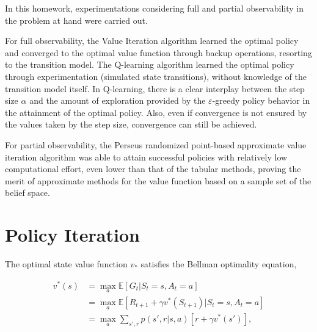 \documentclass[a4paper]{article}
\begin{document}
In this homework, experimentations considering full and partial observability in the problem at hand were carried out.

For full observability, the Value Iteration algorithm learned the optimal policy and converged to the optimal value function through backup operations, resorting to the transition model. The Q-learning algorithm learned the optimal policy through experimentation (simulated state transitions), without knowledge of the transition model itself. In Q-learning, there is a clear interplay between the step size $\alpha$ and the amount of exploration provided by the $\varepsilon$-greedy policy behavior in the attainment of the optimal policy. Also, even if convergence is not ensured by the values taken by the step size, convergence can still be achieved. 

For partial observability, the Perseus randomized point-based approximate value iteration algorithm was able to attain successful policies with relatively low computational effort, even lower than that of the tabular methods, proving the merit of approximate methods for the value function based on a sample set of the belief space.




\vfill
\newpage
\appendix

\section{Policy Iteration}
\label{app_sec:policy_iteration}

The optimal state value function $v_{*}$ satisfies the Bellman optimality equation, 

\begin{align}
v^{*}\left( s \right) &= \max_{a} \mathbb{E} \left[ G_t | S_t =s, A_t = a \right] \\
                              &= \max_{a} \mathbb{E} \left[ R_{t+1} + \gamma v^{*}\left( S_{t+1} \right) | S_t = s, A_t = a \right] \\
                              &= \max_{a} \sum\limits_{s',r} { p\left( {s',r|s,a} \right) \left[ r + \gamma v^{*}\left( s' \right) \right] },
\end{align}
\end{document}
